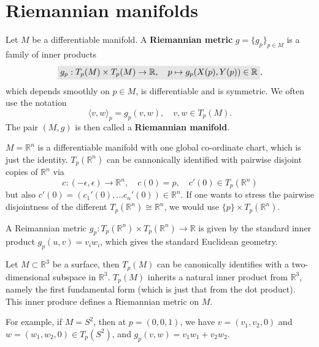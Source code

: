 \documentclass[letter-paper]{tufte-book}
\newenvironment{example}[1][Example]{\begin{trivlist}
\item[\hskip \labelsep {\bfseries #1}]}{\end{trivlist}}
\newcommand{\highlight}[1]{\mathchoice%
  {\colorbox{black!10}{$\displaystyle#1$}}%
  {\colorbox{black!10}{$\textstyle#1$}}%
  {\colorbox{black!10}{$\scriptstyle#1$}}%
  {\colorbox{black!10}{$\scriptscriptstyle#1$}}}%
\begin{document}

\chapter{Riemannian manifolds}

Let $M$ be a differentiable manifold. A \textbf{Riemannian metric} $g = \{g_p\}_{p\in M}$ is a family of inner products
\begin{equation}
  \highlight{g_p : T_p(M) \times T_p(M) \to \mathbb{R}, \quad p \mapsto g_p(X(p), Y(p)) \in \mathbb{R}},
\end{equation}
which depends smoothly on $p\in M$, is differentiable and is symmetric. We often use the notation
\begin{equation}
  \langle v, w\rangle_p = g_p(v, w), \quad v,w\in T_p(M).
\end{equation}
The pair $(M,g)$ is then called a \textbf{Riemannian manifold}.

\begin{example}
  $M = \mathbb{R}^n$ is a differentiable manifold with one global co-ordinate chart, which is just the identity. $T_p(\mathbb{R}^n)$ can be cannonically identified with pairwise disjoint copies of $\mathbb{R}^n$ via
  \begin{equation*}
    c:(-\epsilon, \epsilon) \to \mathbb{R}^n, \quad c(0) = p, \quad c'(0)\in T_p(\mathbb{R}^n)
  \end{equation*}
  but also $c'(0) = (c_1'(0), \ldots c_n'(0)) \in \mathbb{R}^n$. If one wants to stress the pairwise disjointness of the different $T_p(\mathbb{R}^n) \cong \mathbb{R}^n$, we would use $\{p\} \times T_p(\mathbb{R}^n)$.
  
  A Reimannian metric $g_p : T_p(\mathbb{R}^n) \times T_p(\mathbb{R}^n) \to \mathbb{R}$ is given by the standard inner product $g_p(u,v) = v_i w_i$, which gives the standard Euclidean geometry.
\end{example}

\begin{example}
  Let $M \subset \mathbb{R}^3$ be a surface, then $T_p(M)$ can be canonically identifies with a two-dimensional subspace in $\mathbb{R}^3$. $T_p(M)$ inherits a natural inner product from $\mathbb{R}^3$, namely the first fundamental form (which is just that from the dot product). This inner produce defines a Riemannian metric on $M$. 
  
  For example, if $M = S^2$, then at $p=(0,0,1)$, we have $v=(v_1, v_2, 0)$ and $w=(w_1, w_2, 0) \in T_p(S^2)$, and $g_p(v,w) = v_1 w_1 + v_2 w_2$.
\end{example}
\end{document}
